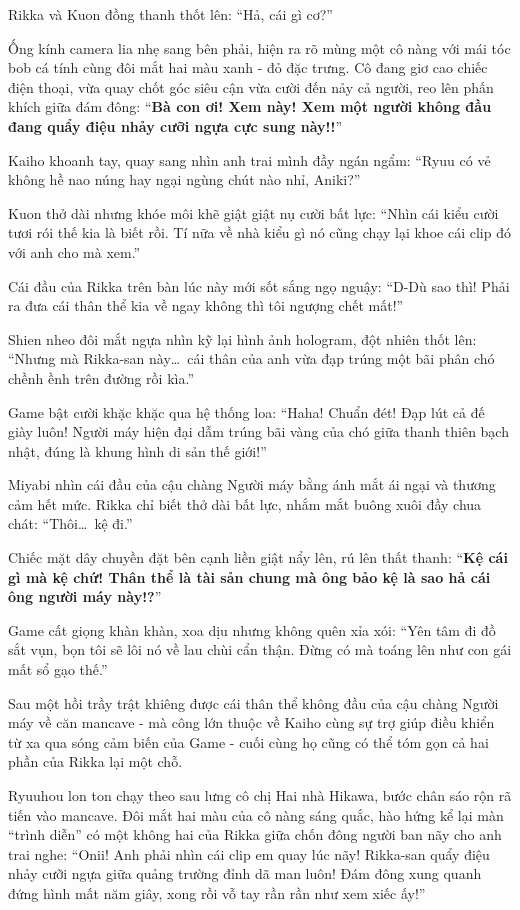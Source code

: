 \documentclass[../main.tex]{subfiles}
\begin{document}
Rikka và Kuon đồng thanh thốt lên: ``Hả, cái gì cơ?''

Ống kính camera lia nhẹ sang bên phải, hiện ra rõ mùng một cô nàng với mái tóc bob cá tính cùng đôi mắt hai màu xanh - đỏ đặc trưng. Cô đang giơ cao chiếc điện thoại, vừa quay chốt góc siêu cận vừa cười đến nảy cả người, reo lên phấn khích giữa đám đông: ``\textbf{Bà con ơi! Xem này! Xem một người không đầu đang quẩy điệu nhảy cưỡi ngựa cực sung này!!}''

Kaiho khoanh tay, quay sang nhìn anh trai mình đầy ngán ngẩm: ``Ryuu có vẻ không hề nao núng hay ngại ngùng chút nào nhỉ, Aniki?''

Kuon thở dài nhưng khóe môi khẽ giật giật nụ cười bất lực: ``Nhìn cái kiểu cười tươi rói thế kia là biết rồi. Tí nữa về nhà kiểu gì nó cũng chạy lại khoe cái clip đó với anh cho mà xem.''

Cái đầu của Rikka trên bàn lúc này mới sốt sắng ngọ nguậy: ``D-Dù sao thì! Phải ra đưa cái thân thể kia về ngay không thì tôi ngượng chết mất!''

Shien nheo đôi mắt ngựa nhìn kỹ lại hình ảnh hologram, đột nhiên thốt lên: ``Nhưng mà Rikka-san này\dots\ cái thân của anh vừa đạp trúng một bãi phân chó chềnh ềnh trên đường rồi kìa.''

Game bật cười khặc khặc qua hệ thống loa: ``Haha! Chuẩn đét! Đạp lút cả đế giày luôn! Người máy hiện đại dẫm trúng bãi vàng của chó giữa thanh thiên bạch nhật, đúng là khung hình di sản thế giới!''

Miyabi nhìn cái đầu của cậu chàng Người máy bằng ánh mắt ái ngại và thương cảm hết mức. Rikka chỉ biết thở dài bất lực, nhắm mắt buông xuôi đầy chua chát: ``Thôi\dots\ kệ đi.''

Chiếc mặt dây chuyền đặt bên cạnh liền giật nẩy lên, rú lên thất thanh: ``\textbf{Kệ cái gì mà kệ chứ! Thân thể là tài sản chung mà ông bảo kệ là sao hả cái ông người máy này!?}''

Game cất giọng khàn khàn, xoa dịu nhưng không quên xỉa xói: ``Yên tâm đi đồ sắt vụn, bọn tôi sẽ lôi nó về lau chùi cẩn thận. Đừng có mà toáng lên như con gái mất sổ gạo thế.''

\ct

Sau một hồi trầy trật khiêng được cái thân thể không đầu của cậu chàng Người máy về căn mancave - mà công lớn thuộc về Kaiho cùng sự trợ giúp điều khiển từ xa qua sóng cảm biến của Game - cuối cùng họ cũng có thể tóm gọn cả hai phần của Rikka lại một chỗ.

Ryuuhou lon ton chạy theo sau lưng cô chị Hai nhà Hikawa, bước chân sáo rộn rã tiến vào mancave. Đôi mắt hai màu của cô nàng sáng quắc, hào hứng kể lại màn ``trình diễn'' có một không hai của Rikka giữa chốn đông người ban nãy cho anh trai nghe: ``Onii! Anh phải nhìn cái clip em quay lúc nãy! Rikka-san quẩy điệu nhảy cưỡi ngựa giữa quảng trường đỉnh dã man luôn! Đám đông xung quanh đứng hình mất năm giây, xong rồi vỗ tay rần rần như xem xiếc ấy!''
\end{document}
